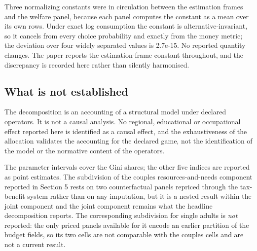 Three normalizing constants were in circulation between the estimation frames and the welfare panel, because each panel computes the constant as a mean over its own rows. Under exact log consumption the constant is alternative-invariant, so it cancels from every choice probability and exactly from the money metric; the deviation over four widely separated values is 2.7e-15. No reported quantity changes. The paper reports the estimation-frame constant throughout, and the discrepancy is recorded here rather than silently harmonised.

\subsection{What is not established}\label{what-is-not-established}

The decomposition is an accounting of a structural model under declared operators. It is not a causal analysis. No regional, educational or occupational effect reported here is identified as a causal effect, and the exhaustiveness of the allocation validates the accounting for the declared game, not the identification of the model or the normative content of the operators.

The parameter intervals cover the Gini shares; the other five indices are reported as point estimates. The subdivision of the couples resources-and-needs component reported in Section 5 rests on two counterfactual panels repriced through the tax-benefit system rather than on any imputation, but it is a nested result within the joint component and the joint component remains what the headline decomposition reports. The corresponding subdivision for single adults is \emph{not} reported: the only priced panels available for it encode an earlier partition of the budget fields, so its two cells are not comparable with the couples cells and are not a current result.

